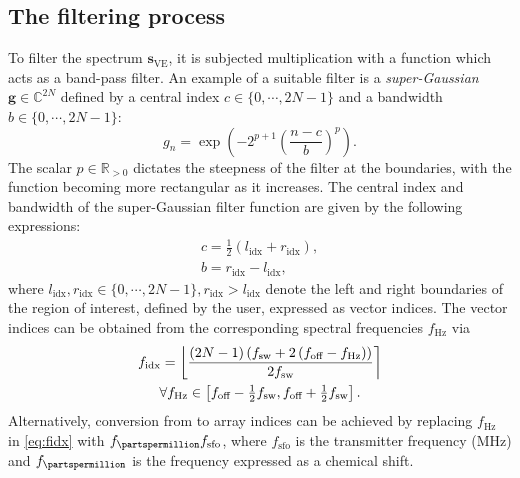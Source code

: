 \subsection{The filtering process}
To filter the spectrum $\symbf{s}_{\text{VE}}$, it is subjected multiplication
with a function which acts as a band-pass filter. An example of a suitable
filter is a \emph{super-Gaussian} $\symbf{g} \in \mathbb{C}^{2N}$ defined by a
central index  $c \in \lbrace 0, \cdots, 2N-1 \rbrace$ and a bandwidth $b \in
\lbrace 0, \cdots, 2N-1 \rbrace$:
\begin{equation}
    g_n = \exp \left(-2^{p+1} \left(\frac{n - c}{b}\right)^p\right).
    \label{eq:super-Gaussian-onedim}
\end{equation}
The scalar $p \in \mathbb{R}_{>0}$ dictates the steepness
of the filter at the boundaries, with the function becoming more rectangular
as it increases.
The central index and bandwidth of the super-Gaussian filter function are given
by the following expressions:
\begin{subequations}
    \begin{gather}
        c = \tfrac{1}{2} \left(l_{\text{idx}} + r_{\text{idx}}\right), \\
        b = r_{\text{idx}} - l_{\text{idx}},
    \end{gather}
\end{subequations}
where $l_{\text{idx}}, r_{\text{idx}} \in \lbrace 0, \cdots, 2N-1 \rbrace,
r_{\text{idx}} > l_{\text{idx}}$ denote the left and right
boundaries of the region of interest, defined by the user, expressed as vector
indices.
The vector indices can be obtained from the corresponding spectral frequencies
$f_{\unit{\hertz}}$ via
\begin{equation}
    \begin{gathered}
        f_{\text{idx}} =
            \left \lfloor
                \frac
                {
                    \left(2N - 1\right)
                    \left(\fsw + 2 \left(\foff - f_{\unit{\hertz}}\right) \right)
                }
                {2 \fsw}
            \right \rceil \\
        \forall f_{\unit{\hertz}} \in
            \left[\foff - \tfrac{1}{2} \fsw, \foff + \tfrac{1}{2} \fsw\right].
        \label{eq:fidx}
    \end{gathered}
\end{equation}
Alternatively, conversion from \unit{\partspermillion} to array indices can be
achieved by replacing  $f_{\unit{\hertz}}$ in \cref{eq:fidx} with
$f_{\unit{\partspermillion}} f_{\text{sfo}}$, where $f_{\text{sfo}}$ is the
transmitter frequency (\unit{\mega \hertz}) and $f_{\unit{\partspermillion}}$
is the frequency expressed as a chemical shift.


